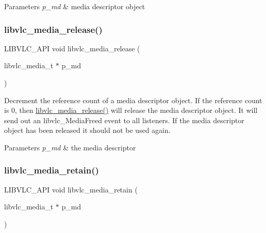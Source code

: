 \begin{DoxyParams}{Parameters}
{\em p\+\_\+md} & media descriptor object \\
\hline
\end{DoxyParams}
\mbox{\label{group__libvlc__media_gaffccede262624a361e20c3e887fa9b42}} 
\subsubsection{\texorpdfstring{libvlc\+\_\+media\+\_\+release()}{libvlc\_media\_release()}}
{\footnotesize\ttfamily L\+I\+B\+V\+L\+C\+\_\+\+A\+PI void libvlc\+\_\+media\+\_\+release (\begin{DoxyParamCaption}\item[{libvlc\+\_\+media\+\_\+t $\ast$}]{p\+\_\+md }\end{DoxyParamCaption})}

Decrement the reference count of a media descriptor object. If the reference count is 0, then \hyperlink{group__libvlc__media_gaffccede262624a361e20c3e887fa9b42}{libvlc\+\_\+media\+\_\+release()} will release the media descriptor object. It will send out an libvlc\+\_\+\+Media\+Freed event to all listeners. If the media descriptor object has been released it should not be used again.


\begin{DoxyParams}{Parameters}
{\em p\+\_\+md} & the media descriptor \\
\hline
\end{DoxyParams}
\mbox{\label{group__libvlc__media_gaf4be74c918bc34ea4182e8028ea5f0ba}} 
\subsubsection{\texorpdfstring{libvlc\+\_\+media\+\_\+retain()}{libvlc\_media\_retain()}}
{\footnotesize\ttfamily L\+I\+B\+V\+L\+C\+\_\+\+A\+PI void libvlc\+\_\+media\+\_\+retain (\begin{DoxyParamCaption}\item[{libvlc\+\_\+media\+\_\+t $\ast$}]{p\+\_\+md }\end{DoxyParamCaption})}

